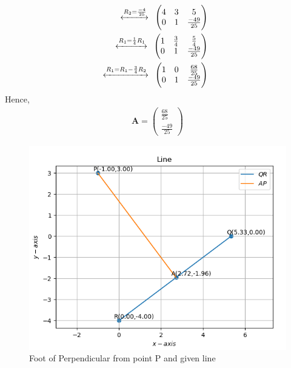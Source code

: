 \documentclass[12pt]{article}
\let\vec\mathbf
\newcommand{\myvec}[1]{\ensuremath{\begin{pmatrix}#1\end{pmatrix}}}
\let\vec\mathbf
\begin{document}
\begin{enumerate}
\begin{align}
\begin{array}{cc|c}
  \end{array}
\\
  \xleftrightarrow{R_2=\frac{-4}{25}}
  \begin{array}{rr|r}
  \myvec{
  4 & 3 & 5\\
  0 & 1 & \frac{-49}{25}}
  \end{array}
\\
  \xleftrightarrow{R_1=\frac{1}{4}R_1}
  \begin{array}{rr|r}
  \myvec{
  1 & \frac{3}{4} & \frac{5}{4}\\
  0 & 1 & \frac{-49}{25}}
  \end{array}
\\
  \xleftrightarrow{R_1=R_1-\frac{3}{4}R_2}
  \begin{array}{rr|r}
  \myvec{
  1 & 0 & \frac{68}{25}\\
  0 & 1 & \frac{-49}{25}}   
  \end{array}        
\end{align}
Hence,
\begin{align}
\vec{A}=\myvec{
\frac{68}{25}\\[1pt]
\frac{-49}{25}
}
\end{align}
\begin{figure}[!h]
	\begin{center} 
	    \includegraphics[width=\columnwidth]{figs/lines.png}
	\end{center}
\caption{Foot of Perpendicular from point P and given line}
\label{fig:Fig}
\end{figure}
\end{enumerate}
\end{document}
